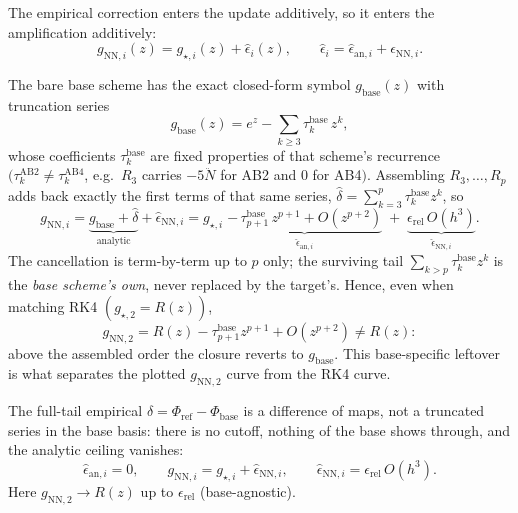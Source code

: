 \documentclass[11pt]{article}
\begin{document}
The empirical correction enters the update additively, so it enters the
amplification additively:
\begin{equation}
  g_{\mathrm{NN},i}(z)=g_{\star,i}(z)+\hat\epsilon_i(z),
  \qquad
  \hat\epsilon_i=\hat\epsilon_{\mathrm{an},i}+\hat\epsilon_{\mathrm{NN},i}.
  \label{eq:gNN}
\end{equation}

\begin{proposition}
\label{prop:finite-order}
The bare base scheme has the exact closed-form symbol $g_{\mathrm{base}}(z)$ with
truncation series
\begin{equation}
  g_{\mathrm{base}}(z)=e^{z}-\sum_{k\ge3}\tau_k^{\mathrm{base}}\,z^{k},
  \label{eq:gbase}
\end{equation}
whose coefficients $\tau_k^{\mathrm{base}}$ are fixed properties of that scheme's
recurrence $(\tau_k^{\mathrm{AB2}}\neq\tau_k^{\mathrm{AB4}}$, e.g.\ $R_3$ carries
$-5\ddot N$ for AB2 and $0$ for AB4$)$. Assembling $R_3,\dots,R_p$ adds back
exactly the first terms of that same series,
$\hat\delta=\sum_{k=3}^{p}\tau_k^{\mathrm{base}}z^{k}$, so
\begin{equation}
  g_{\mathrm{NN},i}
  =\underbrace{g_{\mathrm{base}}+\hat\delta}_{\text{analytic}}+\hat\epsilon_{\mathrm{NN},i}
  =g_{\star,i}
  \;\underbrace{-\,\tau_{p+1}^{\mathrm{base}}\,z^{p+1}+O(z^{p+2})}_{\hat\epsilon_{\mathrm{an},i}}
  \;+\;\underbrace{\epsilon_{\mathrm{rel}}\,O(h^{3})}_{\hat\epsilon_{\mathrm{NN},i}} .
  \label{eq:eps-anal}
\end{equation}
The cancellation is term-by-term up to $p$ only; the surviving tail
$\sum_{k>p}\tau_k^{\mathrm{base}}z^{k}$ is the \emph{base scheme's own}, never
replaced by the target's. Hence, even when matching RK4 $(g_{\star,2}=R(z))$,
\begin{equation}
  g_{\mathrm{NN},2}=R(z)-\tau_{p+1}^{\mathrm{base}}z^{p+1}+O(z^{p+2})\neq R(z):
  \label{eq:not-Rz}
\end{equation}
above the assembled order the closure reverts to $g_{\mathrm{base}}$. This
base-specific leftover is what separates the plotted $g_{\mathrm{NN},2}$ curve
from the RK4 curve.
\end{proposition}

\begin{corollary}
\label{cor:empirical}
The full-tail empirical $\delta=\Phi_{\mathrm{ref}}-\Phi_{\mathrm{base}}$ is a
difference of maps, not a truncated series in the base basis: there is no cutoff,
nothing of the base shows through, and the analytic ceiling vanishes:
\begin{equation}
  \hat\epsilon_{\mathrm{an},i}=0,
  \qquad
  g_{\mathrm{NN},i}=g_{\star,i}+\hat\epsilon_{\mathrm{NN},i},
  \qquad
  \hat\epsilon_{\mathrm{NN},i}=\epsilon_{\mathrm{rel}}\,O(h^{3}).
  \label{eq:eps-nn}
\end{equation}
Here $g_{\mathrm{NN},2}\to R(z)$ up to $\epsilon_{\mathrm{rel}}$ (base-agnostic).
\end{corollary}
\end{document}
